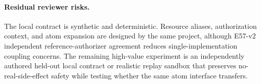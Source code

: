 \paragraph{Residual reviewer risks.}
The local contract is synthetic and deterministic. Resource aliases, authorization context, and atom expansion are designed by the same project, although E57-v2 independent reference-authorizer agreement reduces single-implementation coupling concerns. The remaining high-value experiment is an independently authored held-out local contract or realistic replay sandbox that preserves no-real-side-effect safety while testing whether the same atom interface transfers.
